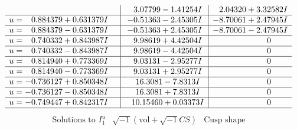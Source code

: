 \documentclass[1p]{elsarticle_modified}
\theoremstyle{definition}
\newcommand{\I}{\sqrt{-1}}
\begin{document}
$$\begin{array}{c|c|c}
 & \phantom{-}3.07799 - 1.41254 I & \phantom{-}2.04320 + 3.32582 I \\ \hline\begin{aligned}
u &= \phantom{-}0.884379 + 0.631379 I\end{aligned}
 & -0.51363 - 2.45305 I & -8.70061 + 2.47945 I \\ \hline\begin{aligned}
u &= \phantom{-}0.884379 - 0.631379 I\end{aligned}
 & -0.51363 + 2.45305 I & -8.70061 - 2.47945 I \\ \hline\begin{aligned}
u &= \phantom{-}0.740332 + 0.843987 I\end{aligned}
 & \phantom{-}9.98619 + 4.42504 I & \phantom{-0.000000 } 0 \\ \hline\begin{aligned}
u &= \phantom{-}0.740332 - 0.843987 I\end{aligned}
 & \phantom{-}9.98619 - 4.42504 I & \phantom{-0.000000 } 0 \\ \hline\begin{aligned}
u &= \phantom{-}0.814940 + 0.773369 I\end{aligned}
 & \phantom{-}9.03131 - 2.95277 I & \phantom{-0.000000 } 0 \\ \hline\begin{aligned}
u &= \phantom{-}0.814940 - 0.773369 I\end{aligned}
 & \phantom{-}9.03131 + 2.95277 I & \phantom{-0.000000 } 0 \\ \hline\begin{aligned}
u &= -0.736127 + 0.850348 I\end{aligned}
 & \phantom{-}16.3081 - 7.8313 I & \phantom{-0.000000 } 0 \\ \hline\begin{aligned}
u &= -0.736127 - 0.850348 I\end{aligned}
 & \phantom{-}16.3081 + 7.8313 I & \phantom{-0.000000 } 0 \\ \hline\begin{aligned}
u &= -0.749447 + 0.842317 I\end{aligned}
 & \phantom{-}10.15460 + 0.03373 I & \phantom{-0.000000 } 0\\
 \hline 
 \end{array}$$\newpage$$\begin{array}{c|c|c}  
\text{Solutions to }I^u_{1}& \I (\text{vol} + \sqrt{-1}CS) & \text{Cusp shape}\\

\end{array}$$
\end{document}
